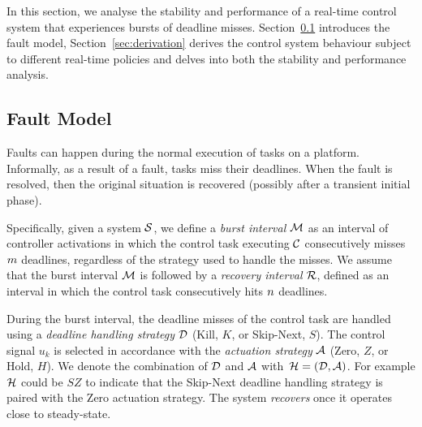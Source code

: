 In this section, we analyse the stability and performance of a real-time control system that experiences bursts of deadline misses. 
Section~\ref{sec:fault} introduces the fault model, Section~\ref{sec:derivation} derives the control system behaviour subject to different real-time policies and delves into both the stability and performance analysis.

\subsection{Fault Model}%
\label{sec:fault}

Faults can happen during the normal execution of tasks on a
platform. Informally, as a result of a fault, tasks miss their
deadlines. When the fault is resolved, then the original
situation is recovered (possibly after a transient initial
phase).

Specifically, given a system $\mathcal{S}$, we define a \emph{burst
interval} $\mathcal{M}$ as an interval of controller activations in
which the control task executing $\mathcal{C}$ consecutively misses
$m$ deadlines, regardless of the strategy
used to handle the misses. We assume that the burst interval
$\mathcal{M}$ is followed by a \emph{recovery interval} $\mathcal{R}$,
defined as an interval in which the control task consecutively
hits $n$ deadlines.

During the burst interval, the deadline misses of the control
task are handled using a \emph{deadline handling strategy}
$\mathcal{D}$ (Kill, $K$, or Skip-Next, $S$). The control signal $u_k$
is selected in accordance with the \emph{actuation strategy}
$\mathcal{A}$ (Zero, $Z$, or Hold, $H$). We denote the combination of
$\mathcal{D}$ and $\mathcal{A}$ with~$\mathcal{H} =
\left(\mathcal{D},\mathcal{A}\right)$. For example $\mathcal{H}$ could be $SZ$
to indicate that the Skip-Next deadline handling strategy is
paired with the Zero actuation strategy.  The system
\emph{recovers} once it operates close to steady-state.


